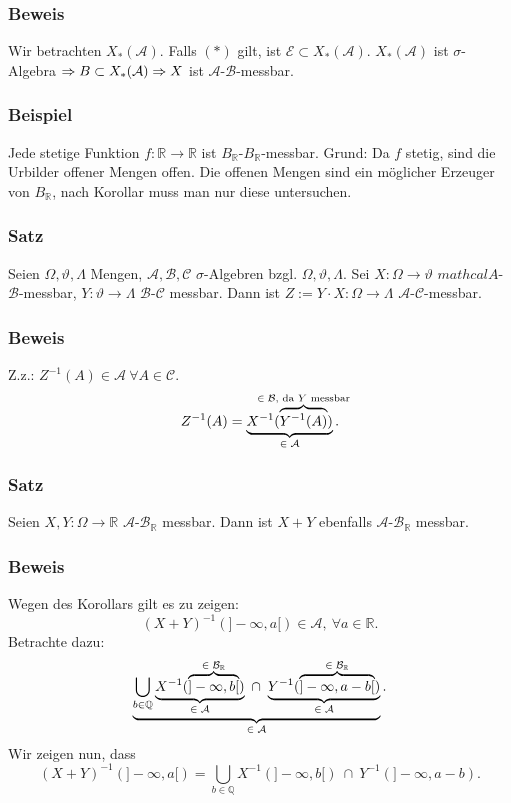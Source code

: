 \subsubsection{Beweis}
Wir betrachten $X_*(\mathcal{A})$. Falls $(*)$ gilt, ist $\mathcal{E}\subset X_*(\mathcal{A})$. $X_*(\mathcal{A})$ ist $\sigma$-Algebra $\Rightarrow B\subset X_*(\mathcal{A})\Rightarrow X$ ist $\mathcal{A}$-$\mathcal{B}$-messbar.
\subsubsection{Beispiel}
Jede stetige Funktion $f\colon\mathbb{R}\to\mathbb{R}$ ist $B_\mathbb{R}$-$B_\mathbb{R}$-messbar. Grund: Da $f$ stetig, sind die Urbilder offener Mengen offen. Die offenen Mengen sind ein m\"oglicher Erzeuger von $B_\mathbb{R}$, nach Korollar muss man nur diese untersuchen.
\subsubsection{Satz}
Seien $\Omega,\vartheta,\Lambda$ Mengen, $\mathcal{A},\mathcal{B},\mathcal{C}$ $\sigma$-Algebren bzgl. $\Omega,\vartheta,\Lambda$. Sei $X\colon\Omega\to\vartheta$ $mathcal{A}$-$\mathcal{B}$-messbar, $Y\colon\vartheta\to\Lambda$ $\mathcal{B}$-$\mathcal{C}$ messbar. Dann ist $Z:=Y\cdot X\colon\Omega\to\Lambda$ $\mathcal{A}$-$\mathcal{C}$-messbar.
\subsubsection{Beweis}
Z.z.: $Z^{-1}(A)\in\mathcal{A}\ \forall A\in\mathcal{C}$.
\[Z^{-1}(A)=\ubr{X^{-1}(\obr{Y^{-1}(A)}{$\in\mathcal{B}$, da $Y$ messbar})}{$\in\mathcal{A}$}.\]
\subsubsection{Satz}
Seien $X,Y\colon\Omega\to\mathbb{R}$ $\mathcal{A}$-$\mathcal{B}_\mathbb{R}$ messbar. Dann ist $X+Y$ ebenfalls $\mathcal{A}$-$\mathcal{B}_\mathbb{R}$ messbar.
\subsubsection{Beweis}
Wegen des Korollars gilt es zu zeigen:
\[(X+Y)^{-1}(]-\infty,a[)\in\mathcal{A},\ \forall a\in\mathbb{R}.\]
Betrachte dazu:
\[\ubr{\bigcup_{b\in\mathbb{Q}}\ubr{X^{-1}(\obr{]-\infty,b[}{$\in\mathcal{B}_\mathbb{R}$})}{$\in\mathcal{A}$}\ \cap\ \ubr{Y^{-1}(\obr{]-\infty,a-b[}{$\in\mathcal{B}_\mathbb{R}$})}{$\in\mathcal{A}$}}{$\in\mathcal{A}$}.\]
Wir zeigen nun, dass
\[(X+Y)^{-1}(]-\infty,a[)=\bigcup_{b\in\mathbb{Q}}X^{-1}(]-\infty,b[)\ \cap\ Y^{-1}(]-\infty,a-b).\]
\bul{
\item ``$\subset$'': Sei $\omega\in(X+Y)^{-1}(]-\infty,a[)\LRA(X+Y)(\omega)<a$. Sei $b\in\mathbb{Q}$ mit $b\in]X(\omega),X(\omega)+\mathcal{\varepsilon}{2}[$. $\RA X(\omega)<b$ und $Y(\omega)+b<X(\omega)+Y(\omega)+\frac{\varepsilon}{2}<a\RA Y(\omega)<a-b$.
\item ``$\supset$'': Sei $\omega\in\ldots\RA\exists b$, sodass $X(\omega)<b$ und $Y(\omega)<a-b\RA(X+Y)(\omega)<a$.
}
